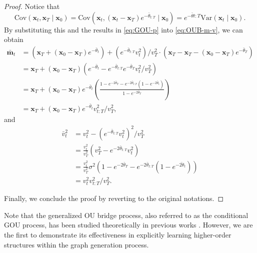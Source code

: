 \begin{proof}
Notice that
\begin{equation}
    \mathrm{Cov}(\mathbf{x}_t,\mathbf{x}_T\mid \mathbf{x}_0)=\mathrm{Cov}\left(\mathbf{x}_t,(\mathbf{x}_t-\mathbf{x}_T)e^{-\bar{\theta}_{t:T}}\mid \mathbf{x}_0\right)=e^{-\bar{\theta}t:T}\mathrm{Var}(\mathbf{x}_t\mid \mathbf{x}_0).
\end{equation}
By substituting this and the results in \cref{eq:GOU-p} into \cref{eq:OUB-m-v}, we can obtain
\begin{equation}
\begin{split}
\bar{\mathbf{m}}_t 
& = \left(\mathbf{x}_T+(\mathbf{x}_0-\mathbf{x}_T)e^{-\bar{\theta}_t}\right)
+ \left(e^{-\bar{\theta}_{t:T}} v_t^2\right)
/ v_T^2
\cdot \left(\mathbf{x}_T - \mathbf{x}_T - (\mathbf{x}_0 - \mathbf{x}_T)e^{-\bar{\theta}_T}\right) \\
& = \mathbf{x}_T + (\mathbf{x}_0-\mathbf{x}_T) \left(e^{-\bar{\theta}_t} -  e^{-\bar{\theta}_{t:T}}e^{-\bar{\theta}_T} v_t^2 /v_T^2\right) \\
& = \mathbf{x}_T + (\mathbf{x}_0-\mathbf{x}_T)e^{-\bar{\theta}_t} 
\left(\frac{1-e^{-2\bar{\theta}_{T}}-e^{-2\bar{\theta}_{t:T}}(1-e^{-2\bar{\theta}_t})}{1-e^{-2\bar{\theta}_{T}}}\right)\\
& = \mathbf{x}_T + (\mathbf{x}_0-\mathbf{x}_T)e^{-\bar{\theta}_t} 
v_{t:T}^2/v_T^2,
\end{split}
\end{equation}
and 
\begin{equation}
\begin{split}
\bar{v}_t^2
& = v_t^2 - \left(e^{-\bar{\theta}_{t:T}} v_t^2 \right)^2 / v_T^2\\
& = \frac{v_t^2}{v_T^2}(v_T^2-e^{-2\bar{\theta}_{t:T}}v_t^2)\\
& = \frac{v_t^2}{v_T^2} \sigma^2\left(1-e^{-2\bar{\theta}_T} - e^{-2\bar{\theta}_{t:T}}(1-e^{-\bar{2\theta}_t})\right)\\
& = v_t^2 v_{t:T}^2/ v_T^2.
\end{split}
\end{equation}

Finally, we conclude the proof by reverting to the original notations.
\end{proof}



Note that the generalized OU bridge process, also referred to as the conditional GOU process, has been studied theoretically in previous works \cite{salminen1984conditional,GOUB2021,GOUB+ICML2024}. However, we are the first to demonstrate its effectiveness in explicitly learning higher-order structures within the graph generation process.


